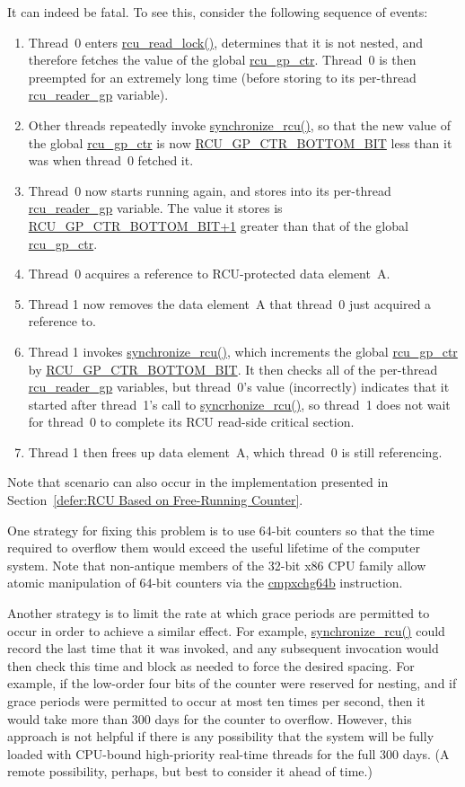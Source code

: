 	It can indeed be fatal.
	To see this, consider the following sequence of events:
	\begin{enumerate}
	\item	Thread~0 enters \url{rcu_read_lock()}, determines
		that it is not nested, and therefore fetches the
		value of the global \url{rcu_gp_ctr}.
		Thread~0 is then preempted for an extremely long time
		(before storing to its per-thread \url{rcu_reader_gp}
		variable).
	\item	Other threads repeatedly invoke \url{synchronize_rcu()},
		so that the new value of the global \url{rcu_gp_ctr}
		is now \url{RCU_GP_CTR_BOTTOM_BIT}
		less than it was when thread~0 fetched it.
	\item	Thread~0 now starts running again, and stores into
		its per-thread \url{rcu_reader_gp} variable.
		The value it stores is
		\url{RCU_GP_CTR_BOTTOM_BIT+1}
		greater than that of the global \url{rcu_gp_ctr}.
	\item	Thread~0 acquires a reference to RCU-protected data
		element~A.
	\item	Thread 1 now removes the data element~A that thread~0
		just acquired a reference to.
	\item	Thread 1 invokes \url{synchronize_rcu()}, which
		increments the global \url{rcu_gp_ctr} by
		\url{RCU_GP_CTR_BOTTOM_BIT}.
		It then checks all of the per-thread \url{rcu_reader_gp}
		variables, but thread~0's value (incorrectly) indicates
		that it started after thread~1's call to
		\url{syncrhonize_rcu()}, so thread~1 does not wait
		for thread~0 to complete its RCU read-side critical
		section.
	\item	Thread 1 then frees up data element~A, which thread~0
		is still referencing.
	\end{enumerate}

	Note that scenario can also occur in the implementation presented in
	Section~\ref{defer:RCU Based on Free-Running Counter}.

	One strategy for fixing this problem is to use 64-bit
	counters so that the time required to overflow them would exceed
	the useful lifetime of the computer system.
	Note that non-antique members of the 32-bit x86 CPU family 
	allow atomic manipulation of 64-bit counters via the
	\url{cmpxchg64b} instruction.

	Another strategy is to limit the rate at which grace periods are
	permitted to occur in order to achieve a similar effect.
	For example, \url{synchronize_rcu()} could record the last time
	that it was invoked, and any subsequent invocation would then
	check this time and block as needed to force the desired
	spacing.
	For example, if the low-order four bits of the counter were
	reserved for nesting, and if grace periods were permitted to
	occur at most ten times per second, then it would take more
	than 300 days for the counter to overflow.
	However, this approach is not helpful if there is any possibility
	that the system will be fully loaded with CPU-bound high-priority
	real-time threads for the full 300 days.
	(A remote possibility, perhaps, but best to consider it ahead
	of time.)

